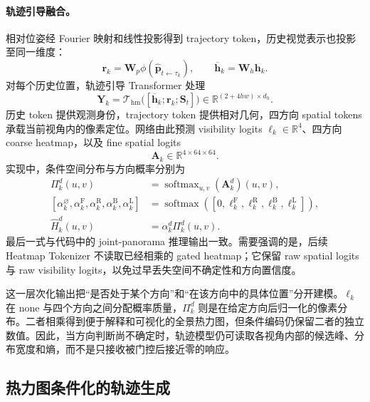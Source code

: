 \documentclass[10pt]{ctexart}
\begin{document}
\paragraph{轨迹引导融合。}
相对位姿经 Fourier 映射和线性投影得到 trajectory token，历史视觉表示也投影至同一维度：
\begin{equation}
  \mathbf{r}_k
  =\mathbf{W}_{p}\phi
   (\widehat{\mathbf{p}}_{t\leftarrow\tau_k}),
  \qquad
  \overline{\mathbf{h}}_k=\mathbf{W}_{h}\mathbf{h}_k.
\end{equation}
对每个历史位置，轨迹引导 Transformer 处理
\begin{equation}
  \mathbf{Y}_k
  =\mathcal{T}_{\mathrm{hm}}
   \bigl([\overline{\mathbf{h}}_k;
          \mathbf{r}_k;\mathbf{S}_t]\bigr)
  \in\mathbb{R}^{(2+4hw)\times d_h}.
\end{equation}
历史 token 提供观测身份，trajectory token 提供相对几何，四方向 spatial tokens 承载当前视角内的像素定位。网络由此预测 visibility logits $\bm{\ell}_k\in\mathbb{R}^{4}$、四方向 coarse heatmap，以及 fine spatial logits
\begin{equation}
  \mathbf{A}_k\in\mathbb{R}^{4\times64\times64}.
\end{equation}
实现中，条件空间分布与方向概率分别为
\begin{align}
  \Pi_k^d(u,v)
  &=\operatorname{softmax}_{u,v}(\mathbf{A}_k^d)(u,v), \\
  [\alpha_k^{\varnothing},\alpha_k^{\mathrm{F}},
   \alpha_k^{\mathrm{R}},\alpha_k^{\mathrm{B}},
   \alpha_k^{\mathrm{L}}]
  &=\operatorname{softmax}
    ([0,\ell_k^{\mathrm{F}},\ell_k^{\mathrm{R}},
       \ell_k^{\mathrm{B}},\ell_k^{\mathrm{L}}]), \\
  \widehat{H}_k^d(u,v)
  &=\alpha_k^d\Pi_k^d(u,v).
\end{align}
最后一式与代码中的 joint-panorama 推理输出一致。需要强调的是，后续 Heatmap Tokenizer 不读取已经相乘的 gated heatmap；它保留 raw spatial logits 与 raw visibility logits，以免过早丢失空间不确定性和方向置信度。

这一层次化输出把“是否处于某个方向”和“在该方向中的具体位置”分开建模。$\bm{\ell}_k$ 在 none 与四个方向之间分配概率质量，$\Pi_k^d$ 则是在给定方向后归一化的像素分布。二者相乘得到便于解释和可视化的全景热力图，但条件编码仍保留二者的独立数值。因此，当方向判断尚不确定时，轨迹模型仍可读取各视角内部的候选峰、分布宽度和熵，而不是只接收被门控后接近零的响应。

\subsection{热力图条件化的轨迹生成}
\end{document}
